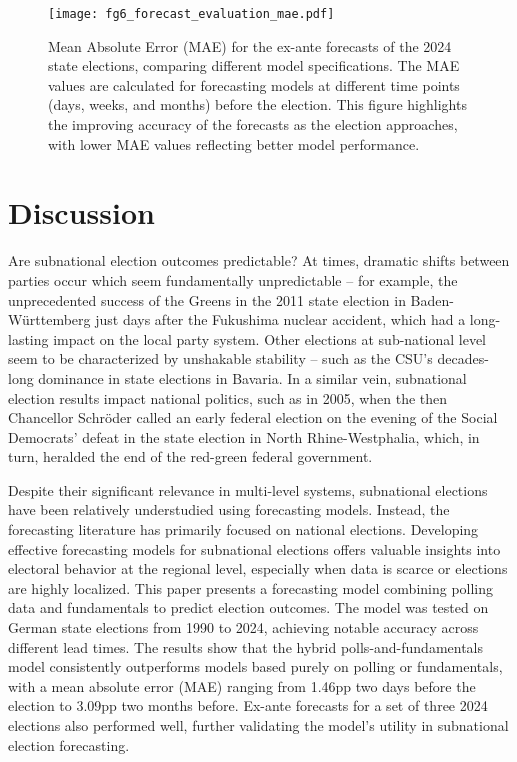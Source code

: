 \documentclass[12pt]{article}
\begin{document}
\begin{doublespacing}
\begin{figure}
    \centering
    \texttt{[image: fg6\_forecast\_evaluation\_mae.pdf]}
    \caption{Mean Absolute Error (MAE) for the ex-ante forecasts of the 2024 state elections, comparing different model specifications. The MAE values are calculated for forecasting models at different time points (days, weeks, and months) before the election. This figure highlights the improving accuracy of the forecasts as the election approaches, with lower MAE values reflecting better model performance.}
    \label{fig:forecast-evaluation-mae}
\end{figure}

\FloatBarrier
\section{Discussion}

Are subnational election outcomes predictable? At times, dramatic shifts between parties occur which seem fundamentally unpredictable -- for example, the unprecedented success of the Greens in the 2011 state election in Baden-Württemberg just days after the Fukushima nuclear accident, which had a long-lasting impact on the local party system. Other elections at sub-national level seem to be characterized by unshakable stability -- such as the CSU's decades-long dominance in state elections in Bavaria. In a similar vein, subnational election results impact national politics, such as in 2005, when the then Chancellor Schröder called an early federal election on the evening of the Social Democrats' defeat in the state election in North Rhine-Westphalia, which, in turn, heralded the end of the red-green federal government. 

Despite their significant relevance in multi-level systems, subnational elections have been relatively understudied using forecasting models. Instead, the forecasting literature has primarily focused on national elections. Developing effective forecasting models for subnational elections offers valuable insights into electoral behavior at the regional level, especially when data is scarce or elections are highly localized. This paper presents a forecasting model combining polling data and fundamentals to predict election outcomes. The model was tested on German state elections from 1990 to 2024, achieving notable accuracy across different lead times. The results show that the hybrid polls-and-fundamentals model consistently outperforms models based purely on polling or fundamentals, with a mean absolute error (MAE) ranging from 1.46pp two days before the election to 3.09pp two months before. Ex-ante forecasts for a set of three 2024 elections also performed well, further validating the model's utility in subnational election forecasting.


\end{doublespacing}
\end{document}
